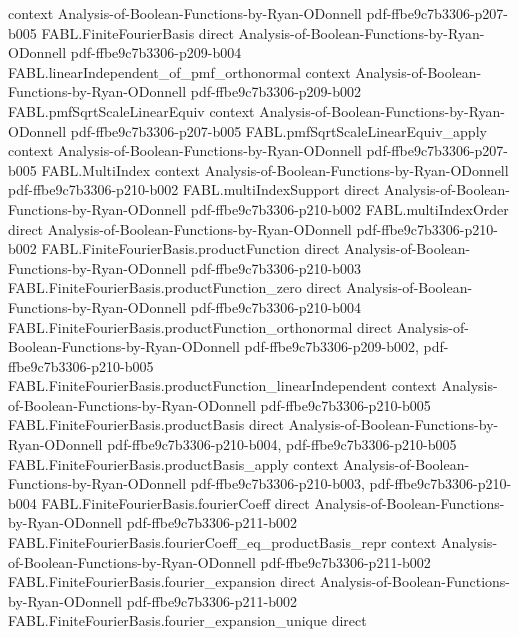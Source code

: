 \begin{theorem}
  {context}
  {Analysis-of-Boolean-Functions-by-Ryan-ODonnell}
  {pdf-ffbe9c7b3306-p207-b005}
\proofstep
  {FABL.FiniteFourierBasis}
  {direct}
  {Analysis-of-Boolean-Functions-by-Ryan-ODonnell}
  {pdf-ffbe9c7b3306-p209-b004}
\proofstep
  {FABL.linearIndependent_of_pmf_orthonormal}
  {context}
  {Analysis-of-Boolean-Functions-by-Ryan-ODonnell}
  {pdf-ffbe9c7b3306-p209-b002}
\proofstep
  {FABL.pmfSqrtScaleLinearEquiv}
  {context}
  {Analysis-of-Boolean-Functions-by-Ryan-ODonnell}
  {pdf-ffbe9c7b3306-p207-b005}
\proofstep
  {FABL.pmfSqrtScaleLinearEquiv_apply}
  {context}
  {Analysis-of-Boolean-Functions-by-Ryan-ODonnell}
  {pdf-ffbe9c7b3306-p207-b005}
\proofstep
  {FABL.MultiIndex}
  {context}
  {Analysis-of-Boolean-Functions-by-Ryan-ODonnell}
  {pdf-ffbe9c7b3306-p210-b002}
\proofstep
  {FABL.multiIndexSupport}
  {direct}
  {Analysis-of-Boolean-Functions-by-Ryan-ODonnell}
  {pdf-ffbe9c7b3306-p210-b002}
\proofstep
  {FABL.multiIndexOrder}
  {direct}
  {Analysis-of-Boolean-Functions-by-Ryan-ODonnell}
  {pdf-ffbe9c7b3306-p210-b002}
\proofstep
  {FABL.FiniteFourierBasis.productFunction}
  {direct}
  {Analysis-of-Boolean-Functions-by-Ryan-ODonnell}
  {pdf-ffbe9c7b3306-p210-b003}
\proofstep
  {FABL.FiniteFourierBasis.productFunction_zero}
  {direct}
  {Analysis-of-Boolean-Functions-by-Ryan-ODonnell}
  {pdf-ffbe9c7b3306-p210-b004}
\proofstep
  {FABL.FiniteFourierBasis.productFunction_orthonormal}
  {direct}
  {Analysis-of-Boolean-Functions-by-Ryan-ODonnell}
  {pdf-ffbe9c7b3306-p209-b002,
    pdf-ffbe9c7b3306-p210-b005}
\proofstep
  {FABL.FiniteFourierBasis.productFunction_linearIndependent}
  {context}
  {Analysis-of-Boolean-Functions-by-Ryan-ODonnell}
  {pdf-ffbe9c7b3306-p210-b005}
\proofstep
  {FABL.FiniteFourierBasis.productBasis}
  {direct}
  {Analysis-of-Boolean-Functions-by-Ryan-ODonnell}
  {pdf-ffbe9c7b3306-p210-b004,
    pdf-ffbe9c7b3306-p210-b005}
\proofstep
  {FABL.FiniteFourierBasis.productBasis_apply}
  {context}
  {Analysis-of-Boolean-Functions-by-Ryan-ODonnell}
  {pdf-ffbe9c7b3306-p210-b003,
    pdf-ffbe9c7b3306-p210-b004}
\proofstep
  {FABL.FiniteFourierBasis.fourierCoeff}
  {direct}
  {Analysis-of-Boolean-Functions-by-Ryan-ODonnell}
  {pdf-ffbe9c7b3306-p211-b002}
\proofstep
  {FABL.FiniteFourierBasis.fourierCoeff_eq_productBasis_repr}
  {context}
  {Analysis-of-Boolean-Functions-by-Ryan-ODonnell}
  {pdf-ffbe9c7b3306-p211-b002}
\proofstep
  {FABL.FiniteFourierBasis.fourier_expansion}
  {direct}
  {Analysis-of-Boolean-Functions-by-Ryan-ODonnell}
  {pdf-ffbe9c7b3306-p211-b002}
\proofstep
  {FABL.FiniteFourierBasis.fourier_expansion_unique}
  {direct}

\end{theorem}
